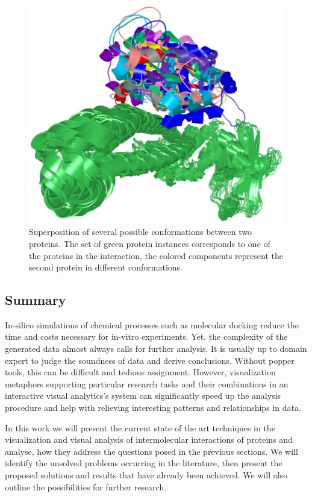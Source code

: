 \begin{figure}[H]
  \centering
  \includegraphics[width=0.5\linewidth]{pictures/problem.png} 
  \caption{Superposition of several possible conformations between two proteins. The set of green protein instances corresponds to one of the proteins in the interaction, the colored components represent the second protein in different conformations.}
  \label{Fig:problem}  
\end{figure} 

\subsection{Summary}
In-silico simulations of chemical processes such as molecular docking reduce the time and costs necessary for in-vitro experiments. Yet, the complexity of the generated data almost always calls for further analysis. It is usually up to domain expert to judge the soundness of data and derive conclusions. Without popper tools, this can be difficult and tedious assignment. However, visualization metaphors supporting particular research tasks and  their combinations in an interactive visual analytics's system can significantly speed up the analysis procedure and help with relieving interesting patterns and relationships in data. 

In this work we will present the current state of the art techniques in the visualization and visual analysis of intermolecular interactions of proteins and analyse, how they address the questions posed in the previous sections. We will identify the unsolved problems occurring in the literature, then present the proposed solutions and results that have already been achieved. We will also outline the possibilities for further research.